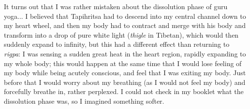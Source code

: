 \documentclass[11pt,twocolumn]{article}
\begin{document}
It turns out that I was rather mistaken about the dissolution phase of
guru yoga... I believed that Tapihritsa had to descend into my central
channel down to my heart wheel, and then my body had to contract and
merge with his body and transform into a drop of pure white light
(\emph{thigle} in Tibetan), which would then suddenly expand to
infinity, but this had a different effect than returning to
\emph{rigpa}: I was sensing a sudden great heat in the heart region,
rapidly expanding to my whole body; this would happen at the same time
that I would lose feeling of my body while being acutely conscious,
and feel that I was exiting my body. Just before that I would worry
about my breathing (as I would not feel my body) and forcefully
breathe in, rather perplexed. I could not check in my booklet what the
dissolution phase was, so I imagined something softer.
\end{document}
